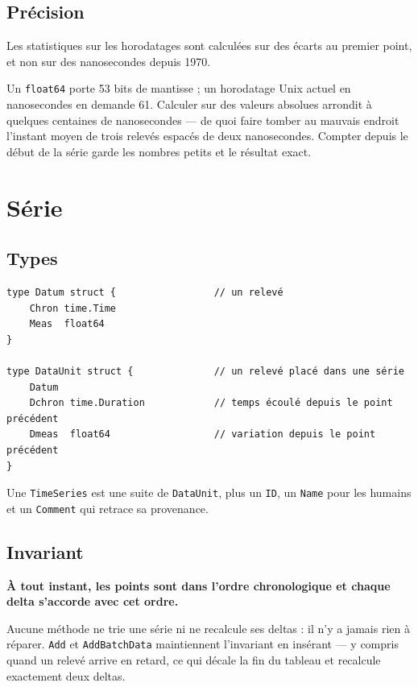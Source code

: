 \documentclass[11pt,a4paper]{report}
\begin{document}
\section{Précision}

Les statistiques sur les horodatages sont calculées sur des écarts au
premier point, et non sur des nanosecondes depuis 1970.

Un \texttt{float64} porte 53 bits de mantisse ; un horodatage Unix
actuel en nanosecondes en demande 61. Calculer sur des valeurs absolues
arrondit à quelques centaines de nanosecondes --- de quoi faire tomber
au mauvais endroit l'instant moyen de trois relevés espacés de deux
nanosecondes. Compter depuis le début de la série garde les nombres
petits et le résultat exact.

\chapter{Série}\label{chap:serie}

\section{Types}

\begin{verbatim}
type Datum struct {                 // un relevé
    Chron time.Time
    Meas  float64
}

type DataUnit struct {              // un relevé placé dans une série
    Datum
    Dchron time.Duration            // temps écoulé depuis le point précédent
    Dmeas  float64                  // variation depuis le point précédent
}
\end{verbatim}

Une \texttt{TimeSeries} est une suite de \texttt{DataUnit}, plus un
\texttt{ID}, un \texttt{Name} pour les humains et un \texttt{Comment}
qui retrace sa provenance.

\section{Invariant}

\textbf{À tout instant, les points sont dans l'ordre chronologique et
chaque delta s'accorde avec cet ordre.}

Aucune méthode ne trie une série ni ne recalcule ses deltas : il n'y a
jamais rien à réparer. \texttt{Add} et \texttt{AddBatchData}
maintiennent l'invariant en insérant --- y compris quand un relevé
arrive en retard, ce qui décale la fin du tableau et recalcule
exactement deux deltas.
\end{document}
